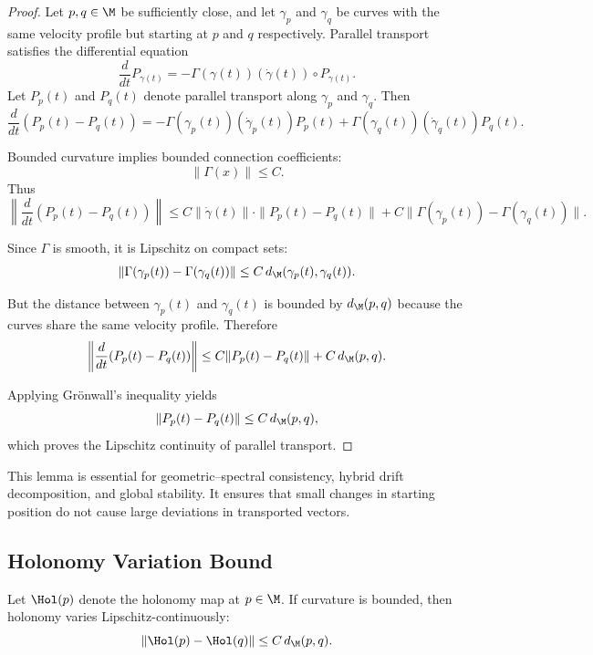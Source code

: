 \begin{proof}
Let $p,q \in \M$ be sufficiently close, and let $\gamma_p$ and $\gamma_q$
be curves with the same velocity profile but starting at $p$ and $q$
respectively. Parallel transport satisfies the differential equation
\[
\frac{d}{dt} P_{\gamma(t)}
= -\Gamma(\gamma(t))(\dot{\gamma}(t)) \circ P_{\gamma(t)}.
\]
Let $P_p(t)$ and $P_q(t)$ denote parallel transport along $\gamma_p$ and
$\gamma_q$. Then
\[
\frac{d}{dt} (P_p(t) - P_q(t))
= -\Gamma(\gamma_p(t))(\dot{\gamma}_p(t)) P_p(t)
+ \Gamma(\gamma_q(t))(\dot{\gamma}_q(t)) P_q(t).
\]

Bounded curvature implies bounded connection coefficients:
\[
\|\Gamma(x)\| \le C.
\]
Thus
\[
\left\| \frac{d}{dt} (P_p(t) - P_q(t)) \right\|
\le
C \|\dot{\gamma}(t)\| \cdot \|P_p(t) - P_q(t)\|
+ C \|\Gamma(\gamma_p(t)) - \Gamma(\gamma_q(t))\|.
\]

Since $\Gamma$ is smooth, it is Lipschitz on compact sets:
\[
\|\Gamma(\gamma_p(t)) - \Gamma(\gamma_q(t))\|
\le
C\, d_\M(\gamma_p(t), \gamma_q(t)).
\]

But the distance between $\gamma_p(t)$ and $\gamma_q(t)$ is bounded by
$d_\M(p,q)$ because the curves share the same velocity profile. Therefore
\[
\left\| \frac{d}{dt} (P_p(t) - P_q(t)) \right\|
\le
C \|P_p(t) - P_q(t)\|
+ C\, d_\M(p,q).
\]

Applying Grönwall's inequality yields
\[
\|P_p(t) - P_q(t)\|
\le
C\, d_\M(p,q),
\]
which proves the Lipschitz continuity of parallel transport.
\end{proof}

\begin{remark}
This lemma is essential for geometric--spectral consistency, hybrid drift
decomposition, and global stability. It ensures that small changes in
starting position do not cause large deviations in transported vectors.
\end{remark}

\subsection{Holonomy Variation Bound}

\begin{lemma}
Let $\Hol(p)$ denote the holonomy map at $p \in \M$.  
If curvature is bounded, then holonomy varies Lipschitz-continuously:
\[
\|\Hol(p) - \Hol(q)\|
\le
C\, d_\M(p,q).
\]
\end{lemma}

